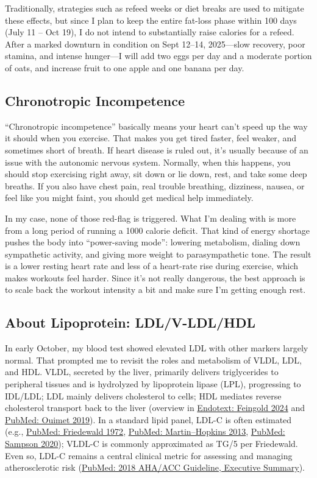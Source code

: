 Traditionally, strategies such as refeed weeks or diet breaks are used to mitigate these effects, but since I plan to keep the entire fat-loss phase within 100 days (July 11 – Oct 19), I do not intend to substantially raise calories for a refeed. After a marked downturn in condition on Sept 12–14, 2025—slow recovery, poor stamina, and intense hunger—I will add two eggs per day and a moderate portion of oats, and increase fruit to one apple and one banana per day.

\subsection{Chronotropic Incompetence}
“Chronotropic incompetence” basically means your heart can’t speed up the way it should when you exercise. That makes you get tired faster, feel weaker, and sometimes short of breath. If heart disease is ruled out, it’s usually because of an issue with the autonomic nervous system. Normally, when this happens, you should stop exercising right away, sit down or lie down, rest, and take some deep breaths. If you also have chest pain, real trouble breathing, dizziness, nausea, or feel like you might faint, you should get medical help immediately.

In my case, none of those red-flag is triggered. What I’m dealing with is more from a long period of running a 1000 calorie deficit. That kind of energy shortage pushes the body into “power-saving mode”: lowering metabolism, dialing down sympathetic activity, and giving more weight to parasympathetic tone. The result is a lower resting heart rate and less of a heart-rate rise during exercise, which makes workouts feel harder. Since it’s not really dangerous, the best approach is to scale back the workout intensity a bit and make sure I’m getting enough rest.

\subsection{About Lipoprotein: LDL/V-LDL/HDL}
In early October, my blood test showed elevated LDL with other markers largely normal. That prompted me to revisit the roles and metabolism of VLDL, LDL, and HDL. VLDL, secreted by the liver, primarily delivers triglycerides to peripheral tissues and is hydrolyzed by lipoprotein lipase (LPL), progressing to IDL/LDL; LDL mainly delivers cholesterol to cells; HDL mediates reverse cholesterol transport back to the liver (overview in \href{https://www.ncbi.nlm.nih.gov/books/NBK305896/}{Endotext: Feingold 2024} and \href{https://pubmed.ncbi.nlm.nih.gov/31071007/}{PubMed: Ouimet 2019}). In a standard lipid panel, LDL-C is often estimated (e.g., \href{https://pubmed.ncbi.nlm.nih.gov/4337382/}{PubMed: Friedewald 1972}, \href{https://pubmed.ncbi.nlm.nih.gov/24240933/}{PubMed: Martin–Hopkins 2013}, \href{https://pubmed.ncbi.nlm.nih.gov/32101259/}{PubMed: Sampson 2020}); VLDL-C is commonly approximated as TG/5 per Friedewald. Even so, LDL-C remains a central clinical metric for assessing and managing atherosclerotic risk (\href{https://pubmed.ncbi.nlm.nih.gov/30423391/}{PubMed: 2018 AHA/ACC Guideline, Executive Summary}).

